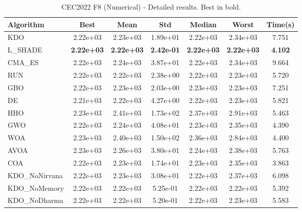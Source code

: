 \begin{table}[H]
\centering\small
\caption{CEC2022 F8 (Numerical) - Detailed results. Best in bold.}
\label{tab:cec2022_F8}
\begin{tabular}{lcccccc}
\toprule
\textbf{Algorithm} & \textbf{Best} & \textbf{Mean} & \textbf{Std} & \textbf{Median} & \textbf{Worst} & \textbf{Time(s)} \\
\midrule
KDO & 2.22e+03 & 2.23e+03 & 1.89e+01 & 2.22e+03 & 2.34e+03 & 7.751 \\
L_SHADE & \textbf{2.22e+03} & \textbf{2.22e+03} & \textbf{2.42e-01} & \textbf{2.22e+03} & \textbf{2.22e+03} & \textbf{4.102} \\
CMA_ES & 2.22e+03 & 2.24e+03 & 3.87e+01 & 2.22e+03 & 2.34e+03 & 9.664 \\
RUN & 2.22e+03 & 2.22e+03 & 2.38e+00 & 2.22e+03 & 2.23e+03 & 5.720 \\
GBO & 2.22e+03 & 2.23e+03 & 2.03e+00 & 2.23e+03 & 2.23e+03 & 7.251 \\
DE & 2.21e+03 & 2.22e+03 & 4.27e+00 & 2.22e+03 & 2.23e+03 & 5.821 \\
HHO & 2.23e+03 & 2.41e+03 & 1.73e+02 & 2.37e+03 & 2.91e+03 & 5.463 \\
GWO & 2.22e+03 & 2.24e+03 & 4.08e+01 & 2.23e+03 & 2.35e+03 & 4.390 \\
WOA & 2.23e+03 & 2.40e+03 & 1.50e+02 & 2.36e+03 & 2.84e+03 & 4.400 \\
AVOA & 2.23e+03 & 2.26e+03 & 3.80e+01 & 2.24e+03 & 2.38e+03 & 5.763 \\
COA & 2.22e+03 & 2.23e+03 & 1.74e+01 & 2.23e+03 & 2.35e+03 & 3.863 \\
KDO_NoNirvana & 2.22e+03 & 2.23e+03 & 3.08e+01 & 2.22e+03 & 2.37e+03 & 6.098 \\
KDO_NoMemory & 2.22e+03 & 2.22e+03 & 5.25e-01 & 2.22e+03 & 2.22e+03 & 5.392 \\
KDO_NoDharma & 2.22e+03 & 2.22e+03 & 5.20e-01 & 2.22e+03 & 2.23e+03 & 5.583 \\
\bottomrule
\end{tabular}
\end{table}
